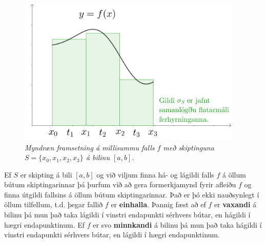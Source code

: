 \begin{ath}
\begin{figure}[H]
\center
\includegraphics[width=0.95\textwidth]{Pictures/k2m7.png}
\caption{\it Myndræn framsetning á millisummu falls $f$ með skiptinguna $S = \{x_{0},x_{1},x_{2},x_{3}\}$ á bilinu $[a,b]$.}
\end{figure}
\end{ath}

\begin{ath}
Ef $S$ er skipting á bili $[a,b]$ og við viljum finna há- og lágildi falls $f$ á öllum bútum skiptingarinnar þá þurfum við að gera formerkjamynd fyrir afleiðu $f$ og finna útgildi fallsins á öllum bútum skiptingarinnar. Það er þó ekki nauðsynlegt í öllum tilfellum, t.d. þegar fallið $f$ er \textbf{einhalla}. Þannig fæst að ef $f$ er \textbf{vaxandi} á bilinu þá mun það taka lágildi í vinstri endapunkti sérhvers bútar, en hágildi í hægri endapunktinum. Ef $f$ er svo \textbf{minnkandi} á bilinu þá mun það taka hágildi í vinstri endapunkti sérhvers bútar, en lágildi í hægri endapunktinum.
\end{ath}

